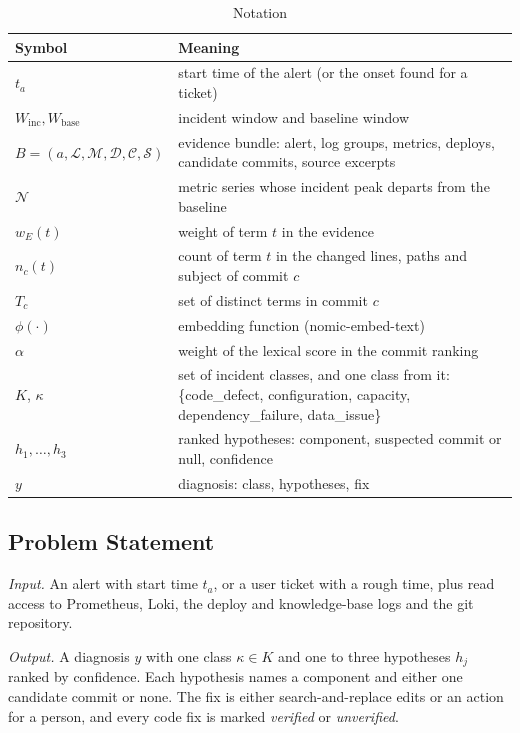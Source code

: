 \documentclass[12pt,onecolumn,draftclsnofoot]{IEEEtran}
\begin{document}
\begin{table}[!t]
\caption{Notation}
\label{tab:notation}
\centering
\small
\begin{tabular}{lL{9.6cm}}
\toprule
\textbf{Symbol} & \textbf{Meaning} \\
\midrule
$t_a$ & start time of the alert (or the onset found for a ticket) \\
$W_{\mathrm{inc}}, W_{\mathrm{base}}$ & incident window and baseline window \\
$B=(a,\mathcal{L},\mathcal{M},\mathcal{D},\mathcal{C},\mathcal{S})$ & evidence bundle: alert, log groups, metrics, deploys, candidate commits, source excerpts \\
$\mathcal{N}$ & metric series whose incident peak departs from the baseline \\
$w_E(t)$ & weight of term $t$ in the evidence \\
$n_c(t)$ & count of term $t$ in the changed lines, paths and subject of commit $c$ \\
$T_c$ & set of distinct terms in commit $c$ \\
$\phi(\cdot)$ & embedding function (nomic-embed-text) \\
$\alpha$ & weight of the lexical score in the commit ranking \\
$K$, $\kappa$ & set of incident classes, and one class from it: \{code\_defect, configuration, capacity, dependency\_failure, data\_issue\} \\
$h_1,\dots,h_3$ & ranked hypotheses: component, suspected commit or null, confidence \\
$y$ & diagnosis: class, hypotheses, fix \\
\bottomrule
\end{tabular}
\end{table}

\subsection{Problem Statement}
\emph{Input.} An alert with start time $t_a$, or a user ticket with a rough time, plus read access to Prometheus, Loki, the deploy and knowledge-base logs and the git repository.

\emph{Output.} A diagnosis $y$ with one class $\kappa\in K$ and one to three hypotheses $h_j$ ranked by confidence. Each hypothesis names a component and either one candidate commit or none. The fix is either search-and-replace edits or an action for a person, and every code fix is marked \emph{verified} or \emph{unverified}.
\end{document}
